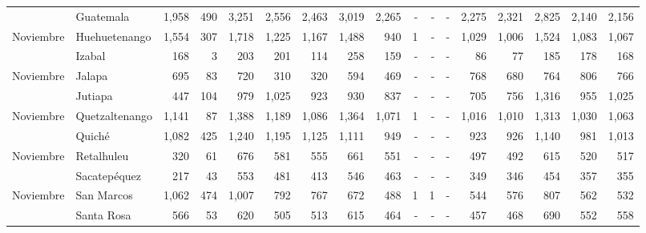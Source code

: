 \begin{landscape}
\begin{center}
\begin{longtable}{llrrrrrrrrrrrrrrr}
			\rowcolor{color1!5!white}\multicolumn{1}{l}{	\footnotesize	 Noviembre 	}&	 Guatemala 	&	 1,958 	&	 490 	&	 3,251 	&	 2,556 	&	 2,463 	&	 3,019 	&	 2,265 	&	 -   	&	 -   	&	 -   	&	 2,275 	&	 2,321 	&	 2,825 	&	 2,140 	&	 2,156 	\\
			\multicolumn{1}{l}{	\footnotesize	 Noviembre 	}&	 Huehuetenango 	&	 1,554 	&	 307 	&	 1,718 	&	 1,225 	&	 1,167 	&	 1,488 	&	 940 	&	 1 	&	 -   	&	 -   	&	 1,029 	&	 1,006 	&	 1,524 	&	 1,083 	&	 1,067 	\\
			\rowcolor{color1!5!white}\multicolumn{1}{l}{	\footnotesize	 Noviembre 	}&	 Izabal 	&	 168 	&	 3 	&	 203 	&	 201 	&	 114 	&	 258 	&	 159 	&	 -   	&	 -   	&	 -   	&	 86 	&	 77 	&	 185 	&	 178 	&	 168 	\\
			\multicolumn{1}{l}{	\footnotesize	 Noviembre 	}&	 Jalapa 	&	 695 	&	 83 	&	 720 	&	 310 	&	 320 	&	 594 	&	 469 	&	 -   	&	 -   	&	 -   	&	 768 	&	 680 	&	 764 	&	 806 	&	 766 	\\
			\rowcolor{color1!5!white}\multicolumn{1}{l}{	\footnotesize	 Noviembre 	}&	 Jutiapa 	&	 447 	&	 104 	&	 979 	&	 1,025 	&	 923 	&	 930 	&	 837 	&	 -   	&	 -   	&	 -   	&	 705 	&	 756 	&	 1,316 	&	 955 	&	 1,025 	\\
			\multicolumn{1}{l}{	\footnotesize	 Noviembre 	}&	 Quetzaltenango 	&	 1,141 	&	 87 	&	 1,388 	&	 1,189 	&	 1,086 	&	 1,364 	&	 1,071 	&	 1 	&	 -   	&	 -   	&	 1,016 	&	 1,010 	&	 1,313 	&	 1,030 	&	 1,063 	\\
			\rowcolor{color1!5!white}\multicolumn{1}{l}{	\footnotesize	 Noviembre 	}&	 Quiché 	&	 1,082 	&	 425 	&	 1,240 	&	 1,195 	&	 1,125 	&	 1,111 	&	 949 	&	 -   	&	 -   	&	 -   	&	 923 	&	 926 	&	 1,140 	&	 981 	&	 1,013 	\\
			\multicolumn{1}{l}{	\footnotesize	 Noviembre 	}&	 Retalhuleu 	&	 320 	&	 61 	&	 676 	&	 581 	&	 555 	&	 661 	&	 551 	&	 -   	&	 -   	&	 -   	&	 497 	&	 492 	&	 615 	&	 520 	&	 517 	\\
			\rowcolor{color1!5!white}\multicolumn{1}{l}{	\footnotesize	 Noviembre 	}&	 Sacatepéquez 	&	 217 	&	 43 	&	 553 	&	 481 	&	 413 	&	 546 	&	 463 	&	 -   	&	 -   	&	 -   	&	 349 	&	 346 	&	 454 	&	 357 	&	 355 	\\
			\multicolumn{1}{l}{	\footnotesize	 Noviembre 	}&	 San Marcos 	&	 1,062 	&	 474 	&	 1,007 	&	 792 	&	 767 	&	 672 	&	 488 	&	 1 	&	 1 	&	 -   	&	 544 	&	 576 	&	 807 	&	 562 	&	 532 	\\
			\rowcolor{color1!5!white}\multicolumn{1}{l}{	\footnotesize	 Noviembre 	}&	 Santa Rosa 	&	 566 	&	 53 	&	 620 	&	 505 	&	 513 	&	 615 	&	 464 	&	 -   	&	 -   	&	 -   	&	 457 	&	 468 	&	 690 	&	 552 	&	 558 	\\

\end{longtable}
\end{center}
\end{landscape}
